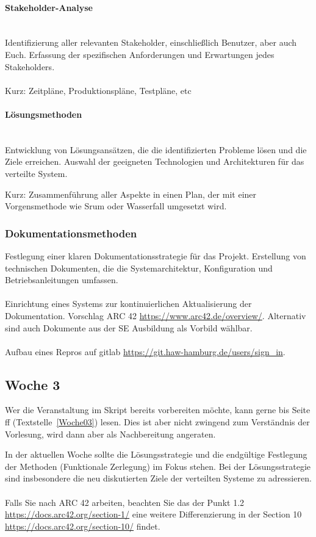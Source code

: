 \paragraph{Stakeholder-Analyse}
\mbox{}\\
Identifizierung aller relevanten Stakeholder, einschließlich Benutzer, aber auch Euch. Erfassung der spezifischen Anforderungen und Erwartungen jedes Stakeholders.
\\\\
Kurz: Zeitpläne, Produktionspläne, Testpläne, etc

\paragraph{Lösungsmethoden}
\mbox{}\\
Entwicklung von Lösungsansätzen, die die identifizierten Probleme lösen und die Ziele erreichen.
Auswahl der geeigneten Technologien und Architekturen für das verteilte System.

Kurz: Zusammenführung aller Aspekte in einen Plan, der mit einer Vorgensmethode wie Srum oder Wasserfall umgesetzt wird.

\subsubsection{Dokumentationsmethoden}

Festlegung einer klaren Dokumentationsstrategie für das Projekt.
Erstellung von technischen Dokumenten, die die Systemarchitektur, Konfiguration und Betriebsanleitungen umfassen.
\\\\
Einrichtung eines Systems zur kontinuierlichen Aktualisierung der Dokumentation. Vorschlag ARC 42 \url{https://www.arc42.de/overview/}. Alternativ sind auch Dokumente aus der SE Ausbildung als Vorbild wählbar.
\\\\
Aufbau eines Repros auf gitlab \url{https://git.haw-hamburg.de/users/sign_in}.
\subsection{Woche 3}
Wer die Veranstaltung im Skript bereits vorbereiten möchte, kann gerne bis Seite \pageref{Woche03}ff (Textstelle~\ref{Woche03}) lesen. Dies ist aber nicht zwingend zum Verständnis der Vorlesung, wird dann aber als Nachbereitung angeraten.

In der aktuellen Woche sollte die Lösungsstrategie und die endgültige Festlegung der Methoden (Funktionale Zerlegung) im Fokus stehen.  Bei der Lösungsstrategie sind insbesondere die neu diskutierten Ziele der verteilten Systeme zu adressieren.
\\\\
Falls Sie nach ARC 42 arbeiten, beachten Sie das der Punkt 1.2 \url{https://docs.arc42.org/section-1/} eine weitere Differenzierung in der Section 10 \url{https://docs.arc42.org/section-10/} findet.
